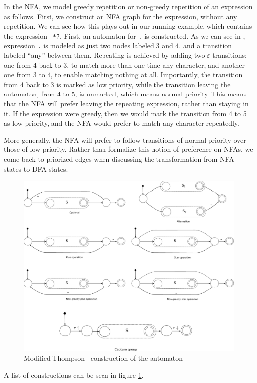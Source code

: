 \documentclass[english]{sigplanconf}
\theoremstyle{definition}
\begin{document}
In the NFA, we model greedy repetition or non-greedy repetition of
an expression as follows.  First, we construct an NFA graph for the
expression, without any repetition.  We can see how this plays out
in our running example, which contains the expression \texttt{.*?}.
First, an automaton for \texttt{.} is constructed.  As we can see
in , expression \texttt{.} is modeled as
just two nodes labeled 3 and 4, and a transition labeled ``any''
between them.  Repeating is achieved by adding two $\varepsilon$
transitions: one from 4 back to 3, to match more than one time any
character, and another one from 3 to 4, to enable matching nothing
at all.  Importantly, the transition from 4 back to 3 is marked as
low priority, while the transition leaving the automaton, from 4
to 5, is unmarked, which means normal priority.  This means that
the NFA will prefer leaving the repeating expression, rather than
staying in it.  If the expression were greedy, then we would mark
the transition from 4 to 5 as low-priority, and the NFA would prefer
to match any character repeatedly.

More generally, the NFA will prefer to follow transitions of normal
priority over those of low priority. Rather than formalize this
notion of preference on NFAs, we come back to priorized edges when
discussing the transformation from NFA states to DFA states.

\begin{figure}[tb]
\includegraphics[width=\linewidth]{graphs/thompson}
\caption{Modified Thompson~\cite{ThompsonRegex} construction of the automaton}
\label{fig:thompson-construction}
\end{figure}
A list of constructions can be seen in figure \ref{fig:thompson-construction}.
\end{document}

